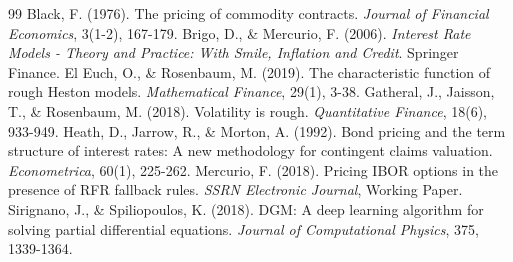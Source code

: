 \documentclass[11pt,a4paper]{article}
\begin{document}
\begin{thebibliography}{99}
 Black, F. (1976). The pricing of commodity contracts. \textit{Journal of Financial Economics}, 3(1-2), 167-179.
 Brigo, D., \& Mercurio, F. (2006). \textit{Interest Rate Models - Theory and Practice: With Smile, Inflation and Credit}. Springer Finance.
 El Euch, O., \& Rosenbaum, M. (2019). The characteristic function of rough Heston models. \textit{Mathematical Finance}, 29(1), 3-38.
 Gatheral, J., Jaisson, T., \& Rosenbaum, M. (2018). Volatility is rough. \textit{Quantitative Finance}, 18(6), 933-949.
 Heath, D., Jarrow, R., \& Morton, A. (1992). Bond pricing and the term structure of interest rates: A new methodology for contingent claims valuation. \textit{Econometrica}, 60(1), 225-262.
 Mercurio, F. (2018). Pricing IBOR options in the presence of RFR fallback rules. \textit{SSRN Electronic Journal}, Working Paper.
 Sirignano, J., \& Spiliopoulos, K. (2018). DGM: A deep learning algorithm for solving partial differential equations. \textit{Journal of Computational Physics}, 375, 1339-1364.
\end{thebibliography}
\end{document}
